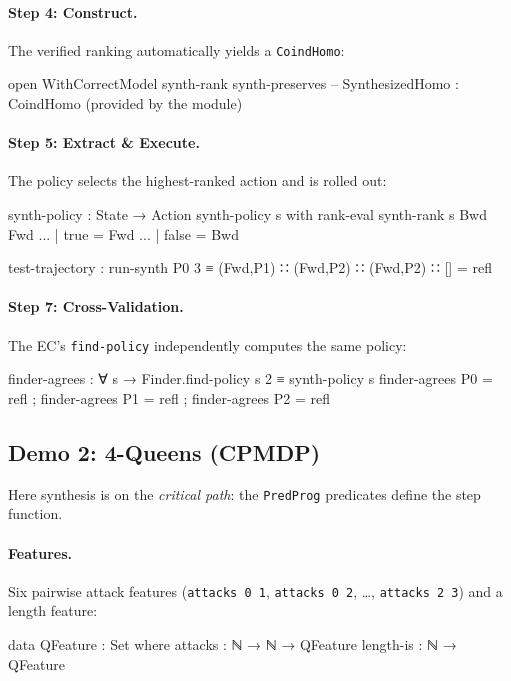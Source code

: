 \documentclass[9pt,a4paper]{article}
\theoremstyle{plain}
\theoremstyle{definition}
\theoremstyle{remark}
\begin{document}
\paragraph{Step 4: Construct.}  The verified ranking automatically yields a \texttt{CoindHomo}:
\begin{spec}
open WithCorrectModel synth-rank synth-preserves
-- SynthesizedHomo : CoindHomo  (provided by the module)
\end{spec}

\paragraph{Step 5: Extract \& Execute.}  The policy selects the highest-ranked action and is rolled out:
\begin{spec}
synth-policy : State → Action
synth-policy s with rank-eval synth-rank s Bwd Fwd
... | true = Fwd    ... | false = Bwd

test-trajectory : run-synth P0 3 ≡ (Fwd,P1) ∷ (Fwd,P2) ∷ (Fwd,P2) ∷ []  = refl
\end{spec}

\paragraph{Step 7: Cross-Validation.}  The EC's \texttt{find-policy} independently computes the same policy:
\begin{spec}
finder-agrees : ∀ s → Finder.find-policy s 2 ≡ synth-policy s
finder-agrees P0 = refl  ;  finder-agrees P1 = refl  ;  finder-agrees P2 = refl
\end{spec}


\subsection{Demo 2: 4-Queens (CPMDP)}
\label{sec:e2e-queens}

Here synthesis is on the \emph{critical path}: the \texttt{PredProg} predicates define the step function.

\paragraph{Features.}  Six pairwise attack features (\texttt{attacks 0 1}, \texttt{attacks 0 2}, \ldots, \texttt{attacks 2 3}) and a length feature:
\begin{spec}
data QFeature : Set where
  attacks   : ℕ → ℕ → QFeature
  length-is : ℕ → QFeature
\end{spec}
\end{document}
